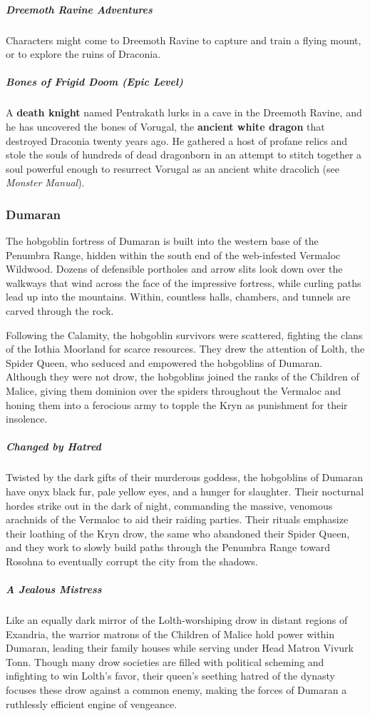 \documentclass[10pt,a4paper,twoside,bg=print,twocolumn,openany,nodeprecatedcode]{dndbook}
\begin{document}
\subparagraph{Dreemoth Ravine Adventures}
Characters might come to Dreemoth Ravine to capture and train a flying mount, or to explore the ruins of Draconia.

\subparagraph{Bones of Frigid Doom (Epic Level)}
A \textbf{death knight} named Pentrakath lurks in a cave in the Dreemoth Ravine, and he has uncovered the bones of Vorugal, the \textbf{ancient white dragon} that destroyed Draconia twenty years ago. He gathered a host of profane relics and stole the souls of hundreds of dead dragonborn in an attempt to stitch together a soul powerful enough to resurrect Vorugal as an ancient white dracolich (see \textit{Monster Manual}).

\subsubsection{Dumaran}
The hobgoblin fortress of Dumaran is built into the western base of the Penumbra Range, hidden within the south end of the web-infested Vermaloc Wildwood. Dozens of defensible portholes and arrow slits look down over the walkways that wind across the face of the impressive fortress, while curling paths lead up into the mountains. Within, countless halls, chambers, and tunnels are carved through the rock.

Following the Calamity, the hobgoblin survivors were scattered, fighting the clans of the Iothia Moorland for scarce resources. They drew the attention of Lolth, the Spider Queen, who seduced and empowered the hobgoblins of Dumaran. Although they were not drow, the hobgoblins joined the ranks of the Children of Malice, giving them dominion over the spiders throughout the Vermaloc and honing them into a ferocious army to topple the Kryn as punishment for their insolence.

\subparagraph{Changed by Hatred}
Twisted by the dark gifts of their murderous goddess, the hobgoblins of Dumaran have onyx black fur, pale yellow eyes, and a hunger for slaughter. Their nocturnal hordes strike out in the dark of night, commanding the massive, venomous arachnids of the Vermaloc to aid their raiding parties. Their rituals emphasize their loathing of the Kryn drow, the same who abandoned their Spider Queen, and they work to slowly build paths through the Penumbra Range toward Rosohna to eventually corrupt the city from the shadows.

\subparagraph{A Jealous Mistress}
Like an equally dark mirror of the Lolth-worshiping drow in distant regions of Exandria, the warrior matrons of the Children of Malice hold power within Dumaran, leading their family houses while serving under Head Matron Vivurk Tonn. Though many drow societies are filled with political scheming and infighting to win Lolth's favor, their queen's seething hatred of the dynasty focuses these drow against a common enemy, making the forces of Dumaran a ruthlessly efficient engine of vengeance.
\end{document}

